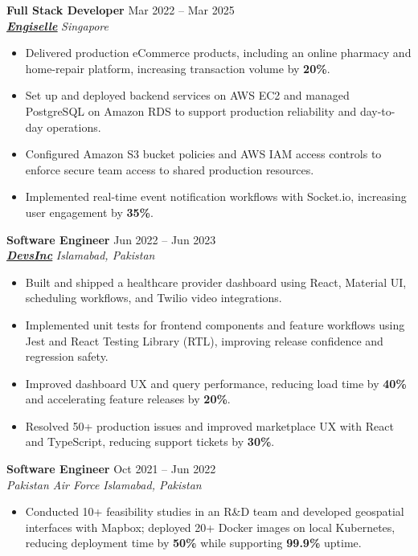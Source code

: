 \documentclass[9pt,letterpaper]{article}
\newcommand{\role}[4]{\textbf{#1} \hfill #2 \\
\textit{#3} \hfill \textit{#4}\\[-5pt]}
\begin{document}
\role{Full Stack Developer}{Mar 2022 -- Mar 2025}{\href{https://www.engiselle.com/}{\textbf{\underline{Engiselle}}}}{Singapore}
\begin{itemize}[leftmargin=*, itemsep=0pt, topsep=0pt, partopsep=0pt, parsep=0pt, after=\vspace{1pt}]
  \item Delivered production eCommerce products, including an online pharmacy and home-repair platform, increasing transaction volume by \textbf{20\%}.
  \item Set up and deployed backend services on AWS EC2 and managed PostgreSQL on Amazon RDS to support production reliability and day-to-day operations.
  \item Configured Amazon S3 bucket policies and AWS IAM access controls to enforce secure team access to shared production resources.
  \item Implemented real-time event notification workflows with Socket.io, increasing user engagement by \textbf{35\%}.
\end{itemize}

\role{Software Engineer}{Jun 2022 -- Jun 2023}{\href{https://www.devsinc.com/}{\textbf{\underline{DevsInc}}}}{Islamabad, Pakistan}
\begin{itemize}[leftmargin=*, itemsep=0pt, topsep=0pt, partopsep=0pt, parsep=0pt, after=\vspace{1pt}]
  \item Built and shipped a healthcare provider dashboard using React, Material UI, scheduling workflows, and Twilio video integrations.
  \item Implemented unit tests for frontend components and feature workflows using Jest and React Testing Library (RTL), improving release confidence and regression safety.
  \item Improved dashboard UX and query performance, reducing load time by \textbf{40\%} and accelerating feature releases by \textbf{20\%}.
  \item Resolved 50+ production issues and improved marketplace UX with React and TypeScript, reducing support tickets by \textbf{30\%}.
\end{itemize}

\role{Software Engineer}{Oct 2021 -- Jun 2022}{Pakistan Air Force}{Islamabad, Pakistan}
\begin{itemize}[leftmargin=*, itemsep=0pt, topsep=0pt, partopsep=0pt, parsep=0pt, after=\vspace{1pt}]
  \item Conducted 10+ feasibility studies in an R\&D team and developed geospatial interfaces with Mapbox; deployed 20+ Docker images on local Kubernetes, reducing deployment time by \textbf{50\%} while supporting \textbf{99.9\%} uptime.
\end{itemize}
\end{document}
